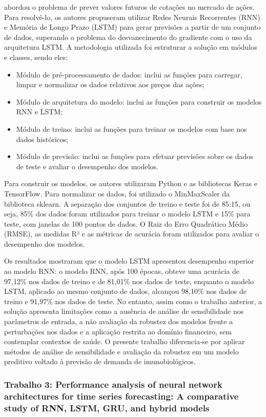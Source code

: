\documentclass[
    12pt,
    openright,
    oneside,
    a4paper,
    english,
    brazil
]{abntex2}
\begin{document}
 abordou o problema de prever valores futuros de cotações no mercado de ações. Para resolvê-lo, os autores propuseram utilizar Redes Neurais Recorrentes (RNN) e Memória de Longo Prazo (LSTM) para gerar previsões a partir de um conjunto de dados, superando o problema do desvanecimento do gradiente com o uso da arquitetura LSTM. A metodologia utilizada foi estruturar a solução em módulos e classes, sendo eles:
\begin{itemize}
\item Módulo de pré-processamento de dados: inclui as funções para carregar, limpar e normalizar os dados relativos aos preços das ações;
\item Módulo de arquitetura do modelo: inclui as funções para construir os modelos RNN e LSTM;
\item Módulo de treino: inclui as funções para treinar os modelos com base nos dados históricos;
\item Módulo de previsão: inclui as funções para efetuar previsões sobre os dados de teste e avaliar o desempenho dos modelos.
\end{itemize}
Para construir os modelos, os autores utilizaram Python e as bibliotecas Keras e TensorFlow. Para normalizar os dados, foi utilizado o MinMaxScaler da biblioteca sklearn. A separação dos conjuntos de treino e teste foi de 85:15, ou seja, 85\% dos dados foram utilizados para treinar o modelo LSTM e 15\% para teste, com janelas de 100 pontos de dados. O Raiz do Erro Quadrático Médio (RMSE), as medidas R² e as métricas de acurácia foram utilizados para avaliar o desempenho dos modelos.

Os resultados mostraram que o modelo LSTM apresentou desempenho superior ao modelo RNN: o modelo RNN, após 100 épocas, obteve uma acurácia de 97,12\% nos dados de treino e de 81,01\% nos dados de teste, enquanto o modelo LSTM, aplicado ao mesmo conjunto de dados, alcançou 98,10\% nos dados de treino e 91,97\% nos dados de teste. No entanto, assim como o trabalho anterior, a solução apresenta limitações como a ausência de análise de sensibilidade nos parâmetros de entrada, a não avaliação da robustez dos modelos frente a perturbações nos dados e a aplicação restrita ao domínio financeiro, sem contemplar contextos de saúde. O presente trabalho diferencia-se por aplicar métodos de análise de sensibilidade e avaliação da robustez em um modelo preditivo voltado à previsão de demanda de imunobiológicos.

\subsubsection{Trabalho 3: Performance analysis of neural network architectures for time series forecasting: A comparative study of RNN, LSTM, GRU, and hybrid models}
\end{document}
